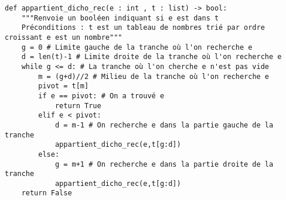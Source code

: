 
\begin{lstlisting}
def appartient_dicho_rec(e : int , t : list) -> bool:
    """Renvoie un booléen indiquant si e est dans t
    Préconditions : t est un tableau de nombres trié par ordre croissant e est un nombre"""
    g = 0 # Limite gauche de la tranche où l'on recherche e
    d = len(t)-1 # Limite droite de la tranche où l'on recherche e
    while g <= d: # La tranche où l'on cherche e n'est pas vide
        m = (g+d)//2 # Milieu de la tranche où l'on recherche e
        pivot = t[m]
        if e == pivot: # On a trouvé e
            return True
        elif e < pivot:
            d = m-1 # On recherche e dans la partie gauche de la tranche
            appartient_dicho_rec(e,t[g:d])
        else:
            g = m+1 # On recherche e dans la partie droite de la tranche
            appartient_dicho_rec(e,t[g:d])
    return False
\end{lstlisting}
